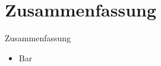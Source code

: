 \section*{Zusammenfassung}

\begin{frame}{Zusammenfassung}
    \begin{itemize}
        \item Bar
    \end{itemize}
\end{frame}
